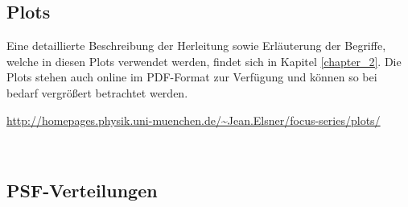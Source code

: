 \begin{appendix}


\chapter{Plots}
Eine detaillierte Beschreibung der Herleitung sowie Erläuterung der Begriffe, welche in diesen Plots verwendet werden, findet sich in Kapitel \ref{chapter_2}. Die Plots stehen auch online im PDF-Format zur Verfügung und können so bei bedarf vergrößert betrachtet werden.
\begin{mdframed}[style=emphasis]
	\centering
	\url{http://homepages.physik.uni-muenchen.de/~Jean.Elsner/focus-series/plots/}
\end{mdframed}
\vfill\,

\section{PSF-Verteilungen}
\label{psf_dists}


\end{appendix}
